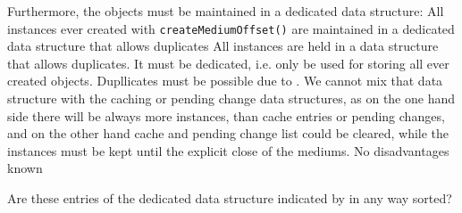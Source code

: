 Furthermore, the \IMediumReference{} objects must be maintained in a dedicated data structure:
{%
All instances ever created with \texttt{createMediumOffset()} are maintained in a dedicated data structure that allows duplicates
}
{%
All instances are held in a data structure that allows duplicates. It must be dedicated, i.e. only be used for storing all ever created \IMediumReference{} objects.
}
{%
Dupllicates must be possible due to . We cannot mix that data structure with the caching or pending change data structures, as on the one hand side there will be always more \IMediumReference{} instances, than cache entries or pending changes, and on the other hand cache and pending change list could be cleared, while the \IMediumReference{} instances must be kept until the explicit close of the mediums.
}
{%
No disadvantages known
}

Are these entries of the dedicated data structure indicated by  in any way sorted?

